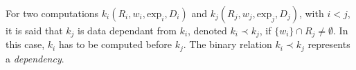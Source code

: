 \begin{mydef}
For two computations $k_i(R_i,w_i,\text{exp}_i,D_i)$ and $k_j(R_j,w_j,\text{exp}_j,D_j)$, with $i < j$, it is said that $k_j$ is data dependant from $k_i$, denoted $k_i\prec k_j$, if $\{w_i\} \cap R_j \neq \emptyset$. In this case, $k_i$ has to be computed before $k_j$. The binary relation $k_i\prec k_j$ represents a \textit{dependency}.
\end{mydef}








